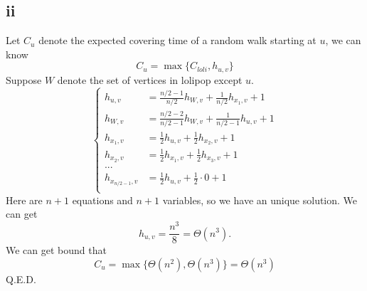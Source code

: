 \documentclass{article}
\begin{document}
	\subsection{ii}
	Let $C_{u}$ denote the expected covering time of a random walk starting at $u$, we can know
	$$
	C_u = \max\{C_{loli},h_{u,v}\}
	$$
	Suppose $W$ denote the set of vertices in lolipop except $u$.
	$$
	\begin{cases}
	h_{u,v} &= \frac{n/2-1}{n/2}h_{W,v}+\frac{1}{n/2}h_{x_1,v}+1\\
	h_{W,v} &= \frac{n/2-2}{n/2-1}h_{W,v}+\frac{1}{n/2-1}h_{u,v}+1\\
	h_{x_1,v} &= \frac{1}{2}h_{u,v}+\frac{1}{2}h_{x_2,v}+1\\
	h_{x_2,v} &= \frac{1}{2}h_{x_1,v}+\frac{1}{2}h_{x_3,v}+1\\
	...\\
	h_{x_{n/2-1},v} &= \frac{1}{2}h_{u,v}+\frac{1}{2} \cdot 0 + 1\\
	\end{cases}
	$$
	Here are $n+1$ equations and $n+1$ variables, so we have an unique solution. We can get
	$$
	h_{u,v}=\frac{n^3}{8}=\Theta(n^3).
	$$
	We can get bound that
	$$
	C_{u} = \max \{\Theta(n^2), \Theta(n^3)\}=\Theta(n^3)
	$$
	Q.E.D.
\end{document}
